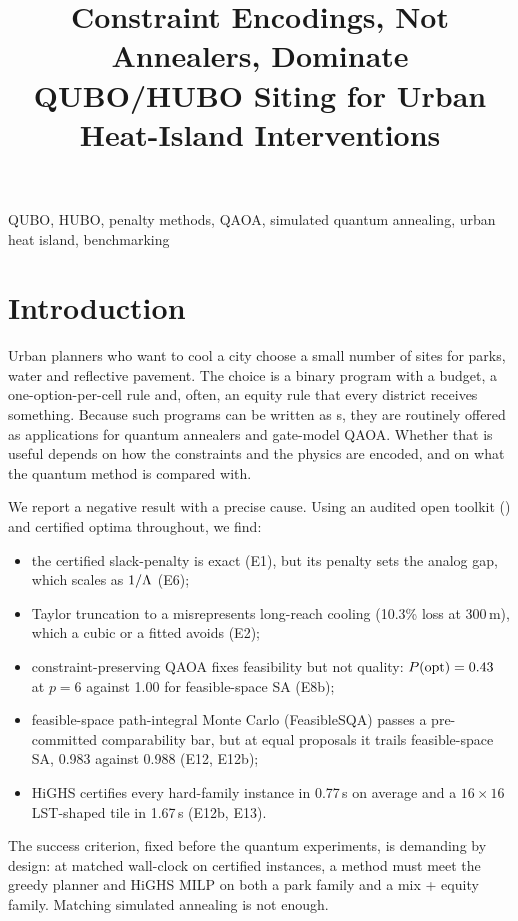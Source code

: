 \documentclass[conference]{IEEEtran}
\begin{document}
\title{Constraint Encodings, Not Annealers, Dominate QUBO/HUBO Siting for Urban Heat-Island Interventions}
\author{
}
\maketitle

\begin{abstract}

\end{abstract}
\begin{IEEEkeywords}
QUBO, HUBO, penalty methods, QAOA, simulated quantum annealing, urban heat island, benchmarking
\end{IEEEkeywords}

\section{Introduction}\label{sec:intro}
Urban planners who want to cool a city choose a small number of sites for parks, water and
reflective pavement. The choice is a binary program with a budget, a one-option-per-cell rule and,
often, an equity rule that every district receives something. Because such programs can be written
as \QUBO{}s, they are routinely offered as applications for quantum annealers and gate-model QAOA.
Whether that is useful depends on how the constraints and the physics are encoded, and on what the
quantum method is compared with.

We report a negative result with a precise cause. Using an audited open toolkit () and
certified optima throughout, we find:
\begin{itemize}
\item the certified slack-penalty \QUBO{} is exact (E1), but its penalty sets the analog gap, which
scales as $1/\Lambda$ (E6);
\item Taylor truncation to a \QUBO{} misrepresents long-reach cooling (10.3\% loss at 300\,m), which a
cubic \HUBO{} or a fitted \QUBO{} avoids (E2);
\item constraint-preserving QAOA fixes feasibility but not quality: $P(\mathrm{opt})=0.43$ at $p=6$ against 1.00
for feasible-space SA (E8b);
\item feasible-space path-integral Monte Carlo (FeasibleSQA) passes a pre-committed comparability bar,
but at equal proposals it trails feasible-space SA, 0.983 against 0.988 (E12, E12b);
\item HiGHS certifies every hard-family instance in 0.77\,s on average and a $16\times16$
LST-shaped tile in 1.67\,s (E12b, E13).
\end{itemize}
The success criterion, fixed before the quantum experiments, is demanding by design: at matched
wall-clock on certified instances, a method must meet the greedy planner and HiGHS MILP on both a
park family and a mix + equity family. Matching simulated annealing is not enough.
\end{document}
